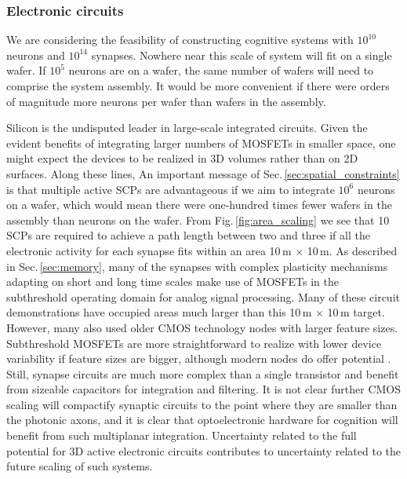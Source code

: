 \documentclass[twocolumn]{article}
\begin{document}
\subsubsection{Electronic circuits}
We are considering the feasibility of constructing cognitive systems with $10^{10}$ neurons and $10^{14}$ synapses. Nowhere near this scale of system will fit on a single wafer. If $10^5$ neurons are on a wafer, the same number of wafers will need to comprise the system assembly. It would be more convenient if there were orders of magnitude more neurons per wafer than wafers in the assembly.

Silicon is the undisputed leader in large-scale integrated circuits. Given the evident benefits of integrating larger numbers of MOSFETs in smaller space, one might expect the devices to be realized in 3D volumes \cite{ro1983,knan2008,saan2008,viba2011,zhxi2015,li2013,elfe2016} rather than on 2D surfaces. Along these lines, An important message of Sec.\,\ref{sec:spatial_constraints} is that multiple active SCPs are advantageous if we aim to integrate $10^6$ neurons on a wafer, which would mean there were one-hundred times fewer wafers in the assembly than neurons on the wafer. From Fig.\,\ref{fig:area_scaling} we see that 10 SCPs are required to achieve a path length between two and three if all the electronic activity for each synapse fits within an area 10\,\textmu m $\times$ 10\,\textmu m. As described in Sec.\,\ref{sec:memory}, many of the synapses with complex plasticity mechanisms adapting on short and long time scales make use of MOSFETs in the subthreshold operating domain for analog signal processing. Many of these circuit demonstrations have occupied areas much larger than this 10\,\textmu m $\times$ 10\,\textmu m target. However, many also used older CMOS technology nodes with larger feature sizes. Subthreshold MOSFETs are more straightforward to realize with lower device variability if feature sizes are bigger, although modern nodes do offer potential \cite{rupa2019}. Still, synapse circuits are much more complex than a single transistor and benefit from sizeable capacitors for integration and filtering. It is not clear further CMOS scaling will compactify synaptic circuits to the point where they are smaller than the photonic axons, and it is clear that optoelectronic hardware for cognition will benefit from such multiplanar integration. Uncertainty related to the full potential for 3D active electronic circuits \cite{lish2017} contributes to uncertainty related to the future scaling of such systems.
\end{document}
